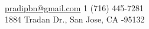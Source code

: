 \documentclass[10pt,a4paper]{article} %
\begin{document}
 


\\ %

\noindent\href{mailto:pradipbn@gmail.com}{pradipbn@gmail.com}\bull %
\textsmaller{+}1 (716) 445-7281\\%
1884 Tradan Dr., San Jose, CA -95132

\spacedhrule{0.9em}{-0.4em} %




\end{document}
